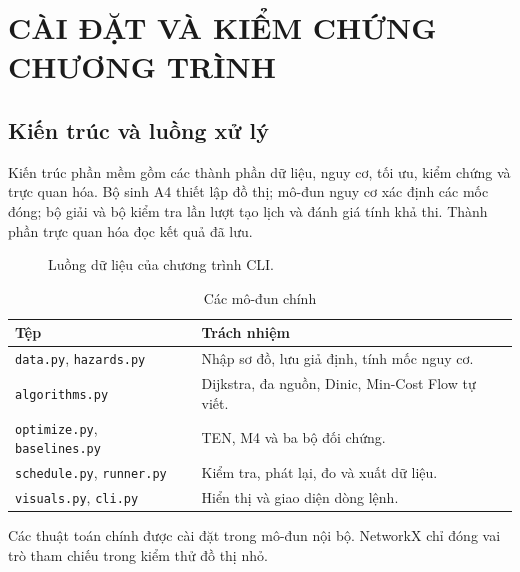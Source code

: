 \clearpage\section{CÀI ĐẶT VÀ KIỂM CHỨNG CHƯƠNG TRÌNH}
\subsection{Kiến trúc và luồng xử lý}
Kiến trúc phần mềm gồm các thành phần dữ liệu, nguy cơ, tối ưu, kiểm chứng và trực quan hóa. Bộ sinh A4 thiết lập đồ thị; mô-đun nguy cơ xác định các mốc đóng; bộ giải và bộ kiểm tra lần lượt tạo lịch và đánh giá tính khả thi. Thành phần trực quan hóa đọc kết quả đã lưu.

\begin{figure}[htbp]\centering
{}\caption{Luồng dữ liệu của chương trình CLI.}\end{figure}

\begin{table}[htbp]\centering\caption{Các mô-đun chính}
\small\begin{tabularx}{\linewidth}{P{4.5cm}X}\toprule
Tệp & Trách nhiệm\\\midrule
\texttt{data.py}, \texttt{hazards.py} & Nhập sơ đồ, lưu giả định, tính mốc nguy cơ.\\
\texttt{algorithms.py} & Dijkstra, đa nguồn, Dinic, Min-Cost Flow tự viết.\\
\texttt{optimize.py}, \texttt{baselines.py} & TEN, M4 và ba bộ đối chứng.\\
\texttt{schedule.py}, \texttt{runner.py} & Kiểm tra, phát lại, đo và xuất dữ liệu.\\
\texttt{visuals.py}, \texttt{cli.py} & Hiển thị và giao diện dòng lệnh.\\\bottomrule
\end{tabularx}\end{table}
Các thuật toán chính được cài đặt trong mô-đun nội bộ. NetworkX chỉ đóng vai trò tham chiếu trong kiểm thử đồ thị nhỏ.

